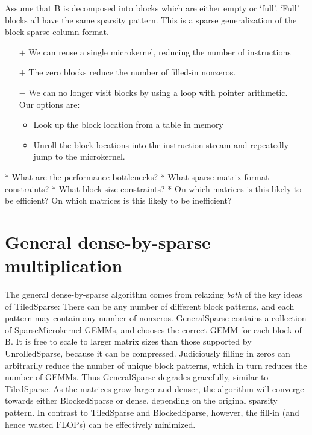 {  Assume that B is decomposed into blocks which are either empty or `full'. `Full' blocks all have the same sparsity pattern. This is a sparse generalization of the block-sparse-column format.

  \begin{itemize}
  \item[$+$] We can reuse a single microkernel, reducing the number of instructions
  \item[$+$] The zero blocks reduce the number of filled-in nonzeros.
  \item[$-$] We can no longer visit blocks by using a loop with pointer arithmetic. \\Our options are:
    \begin{itemize}
    \item Look up the block location from a table in memory
    \item Unroll the block locations into the instruction stream and repeatedly jump to the microkernel.
    \end{itemize}
  \end{itemize}




* What are the performance bottlenecks?
* What sparse matrix format constraints?
* What block size constraints?
* On which matrices is this likely to be efficient? On which matrices is this likely to be inefficient?


\section{General dense-by-sparse multiplication}

The general dense-by-sparse algorithm comes from relaxing \emph{both} of the key ideas of TiledSparse: There can be any number of different block patterns, and each pattern may contain any number of nonzeros. GeneralSparse contains a collection of SparseMicrokernel GEMMs, and chooses the correct GEMM for each block of B. It is free to scale to larger matrix sizes than those supported by UnrolledSparse, because it can be compressed. Judiciously filling in zeros can arbitrarily reduce the number of unique block patterns, which in turn reduces the number of GEMMs. Thus GeneralSparse degrades gracefully, similar to TiledSparse. As the matrices grow larger and denser, the algorithm will converge towards either BlockedSparse or dense, depending on the original sparsity pattern. In contrast to TiledSparse and BlockedSparse, however, the fill-in (and hence wasted FLOPs) can be effectively minimized.

}
